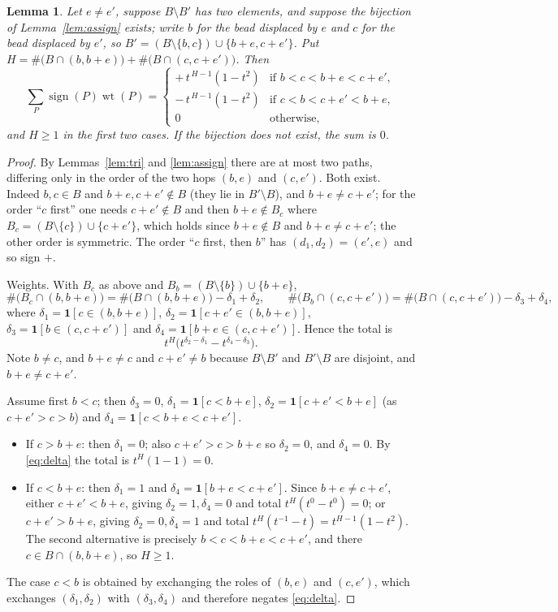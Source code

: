 \documentclass[11pt]{article}
\newtheorem{lemma}[theorem]{Lemma}
\theoremstyle{definition}
\newcommand{\one}{\mathbf{1}}
\begin{document}
\begin{lemma}\label{lem:type1}
Let $e\ne e'$, suppose $B\setminus B'$ has two elements, and suppose the bijection of
Lemma~\ref{lem:assign} exists; write $b$ for the bead displaced by $e$ and $c$ for the bead
displaced by $e'$, so $B'=(B\setminus\{b,c\})\cup\{b+e,c+e'\}$. Put
$H=\#\bigl(B\cap(b,b+e)\bigr)+\#\bigl(B\cap(c,c+e')\bigr)$. Then
\[
\sum_{P}\operatorname{sign}(P)\operatorname{wt}(P)=
\begin{cases}
+\,t^{\,H-1}(1-t^2)&\text{if }b<c<b+e<c+e',\\
-\,t^{\,H-1}(1-t^2)&\text{if }c<b<c+e'<b+e,\\
0&\text{otherwise,}
\end{cases}
\]
and $H\ge1$ in the first two cases. If the bijection does not exist, the sum is $0$.
\end{lemma}

\begin{proof}
By Lemmas~\ref{lem:tri} and \ref{lem:assign} there are at most two paths, differing only in the
order of the two hops $(b,e)$ and $(c,e')$. Both exist. Indeed $b,c\in B$ and
$b+e,c+e'\notin B$ (they lie in $B'\setminus B$), and $b+e\ne c+e'$; for the order
``$c$ first'' one needs $c+e'\notin B$ and then $b+e\notin B_c$ where
$B_c=(B\setminus\{c\})\cup\{c+e'\}$, which holds since $b+e\notin B$ and $b+e\ne c+e'$; the other
order is symmetric. The order ``$c$ first, then $b$'' has $(d_1,d_2)=(e',e)$ and so sign $+$.

Weights. With $B_c$ as above and $B_b=(B\setminus\{b\})\cup\{b+e\}$,
\[
\#\bigl(B_c\cap(b,b+e)\bigr)=\#\bigl(B\cap(b,b+e)\bigr)-\delta_1+\delta_2,\qquad
\#\bigl(B_b\cap(c,c+e')\bigr)=\#\bigl(B\cap(c,c+e')\bigr)-\delta_3+\delta_4,
\]
where $\delta_1=\one[c\in(b,b+e)]$, $\delta_2=\one[c+e'\in(b,b+e)]$, $\delta_3=\one[b\in(c,c+e')]$
and $\delta_4=\one[b+e\in(c,c+e')]$. Hence the total is
\begin{equation}\label{eq:delta}
t^{H}\bigl(t^{\delta_2-\delta_1}-t^{\delta_4-\delta_3}\bigr).
\end{equation}
Note $b\ne c$, and $b+e\ne c$ and $c+e'\ne b$ because $B\setminus B'$ and $B'\setminus B$ are
disjoint, and $b+e\ne c+e'$.

Assume first $b<c$; then $\delta_3=0$, $\delta_1=\one[c<b+e]$,
$\delta_2=\one[c+e'<b+e]$ (as $c+e'>c>b$) and $\delta_4=\one[c<b+e<c+e']$.
\begin{itemize}
\item If $c>b+e$: then $\delta_1=0$; also $c+e'>c>b+e$ so $\delta_2=0$, and $\delta_4=0$. By
\eqref{eq:delta} the total is $t^H(1-1)=0$.
\item If $c<b+e$: then $\delta_1=1$ and $\delta_4=\one[b+e<c+e']$. Since $b+e\ne c+e'$, either
$c+e'<b+e$, giving $\delta_2=1,\delta_4=0$ and total $t^H(t^0-t^0)=0$; or $c+e'>b+e$, giving
$\delta_2=0,\delta_4=1$ and total $t^H(t^{-1}-t)=t^{H-1}(1-t^2)$. The second alternative is
precisely $b<c<b+e<c+e'$, and there $c\in B\cap(b,b+e)$, so $H\ge1$.
\end{itemize}
The case $c<b$ is obtained by exchanging the roles of $(b,e)$ and $(c,e')$, which exchanges
$(\delta_1,\delta_2)$ with $(\delta_3,\delta_4)$ and therefore negates \eqref{eq:delta}.
\end{proof}
\end{document}
